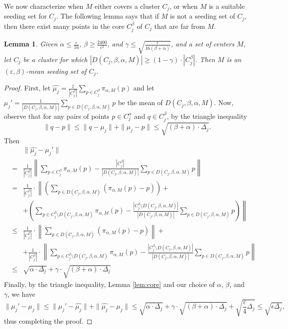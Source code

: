 \documentclass[10pt,a4paper]{amsart}
\newtheorem{lemma}[theorem]{Lemma}
\begin{document}
We now characterize when $M$ either covers a cluster $C_j$, or when $M$ is a suitable seeding set for $C_j$. The following lemma says that if $M$ is not a seeding set of $C_j$, then there exist many points in the core $C_j^\beta$ of $C_j$ that are far from $M$.

\begin{lemma}
\label{lem:closecore}
    Given $\alpha\leq \frac{\varepsilon}{16}$, $\beta \geq \frac{2400}{\varepsilon^{2}}$, and $\gamma\leq \sqrt{\frac{\varepsilon}{16(\beta+\alpha)}}$,
    and a set of centers $M$, let $C_j$ be a cluster for which $|D(C_j,\beta,\alpha,M)| \geq (1-\gamma)\cdot |C_j^\beta|$. 
    Then $M$ is an $(\varepsilon,\beta)$-mean seeding set of $C_j$. 
\end{lemma}
\begin{proof}
    First, let $\hat{\mu_j} = \frac{1}{|C_j^\beta|}\sum_{p\in C_j^\beta}\pi_{\alpha,M}(p)$ and let 
    $\mu_j' = \frac{1}{|D(C_j,\beta,\alpha,M)|}\sum_{p\in D(C_j,\beta,\alpha,M)}p$ be the mean of $D(C_j,\beta,\alpha,M)$. 
    Now, observe that for any pairs of points $p\in C_j^\alpha$ and $q\in C_j^\beta$, by the triangle inequality 
    $$
    \|q-p\|\leq \|q - \mu_j\| + \|\mu_j - p\|\le \sqrt{(\beta+\alpha)\cdot \Delta_j}.
    $$
    Then
    \begin{eqnarray*}
        & & \|\hat{\mu_j}- \mu_j'\| \\
        & = & \frac{1}{|C_j^\beta|} \left\|\sum_{p\in C_j^\beta}\pi_{\alpha,M}(p) - \frac{|C_j^\beta|}{|D(C_j,\beta,\alpha,M)|}\sum_{p\in D(C_j,\beta,\alpha,M)}p\right\|\\
        & = &\frac{1}{|C_j^\beta|}\cdot \left\|\left(\sum_{p\in D(C_j,\beta,\alpha,M)}(\pi_{\alpha,M}(p)-p)\right)\right. + \\
        & & + \left.\left(\sum_{p\in C_j^\beta\setminus D(C_j,\beta,\alpha,M)}\pi_{\alpha,M}(p) - \frac{|C_j^\beta\setminus D(C_j,\beta,\alpha,M)|}{|D(C_j,\beta,\alpha,M)|}\sum_{p\in D(C_j,\beta,\alpha,M)}p\right)\right\|\\
        &\leq& \frac{1}{|C_j^\beta|}\cdot \left\|\sum_{p\in D(C_j,\beta,\alpha,M)}(\pi_{\alpha,M}(p)-p)\right\| + \\
        & & + \frac{1}{|C_j^\beta|}\cdot
        \left\|\sum_{p\in C_j^\beta\setminus D(C_j,\beta,\alpha,M)}\pi_{\alpha,M}(p) - \frac{|C_j^\beta\setminus D(C_j,\beta,\alpha,M)|}{|D(C_j,\beta,\alpha,M)|}\sum_{p\in D(C_j,\beta,\alpha,M)}p\right\| \\
        &\leq& \sqrt{\alpha \cdot \Delta_j} + \gamma\cdot \sqrt{(\beta+\alpha)\cdot \Delta_j}
    \end{eqnarray*}
    Finally, by the triangle inequality, Lemma \ref{lem:core} and our choice of $\alpha$, $\beta$, and $\gamma$, we have
    $$\|\mu_j'-\mu_j\|\leq \|\mu_j'-\hat{\mu_j}\| + \|\hat{\mu_j}-\mu_j\|\leq \sqrt{\alpha \cdot \Delta_j} + \gamma\cdot \sqrt{(\beta+\alpha)\cdot \Delta_j} + \sqrt{\frac{\varepsilon}{4}\Delta_j} \le \sqrt{\epsilon\Delta_j},$$
thus completing the proof.
\end{proof}
\end{document}
